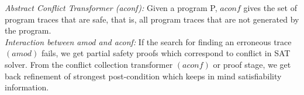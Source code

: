 \textit{Abstract Conflict Transformer (aconf):} Given a program P, $aconf$ gives the 
set of program traces that are safe, that is, all program traces that are not
generated by the program. \\

\textit{Interaction between amod and aconf:} If the search for finding an 
erroneous trace $(amod)$ fails, we get partial safety proofs which correspond 
to conflict in SAT solver. From the conflict collection transformer $(aconf)$ or 
proof stage, we get back refinement of strongest post-condition which keeps in 
mind satisfiability information. 

